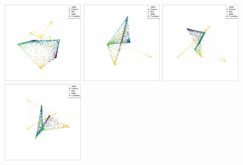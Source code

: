 \documentclass[
  letterpaper,
]{krantz}
\begin{document}
\begin{figure}

\begin{minipage}{0.33\linewidth}
\includegraphics[width=1.35417in,height=\textheight,keepaspectratio]{images/fashion_confustion_gt_36.png}\end{minipage}%
%
\begin{minipage}{0.33\linewidth}
\includegraphics[width=1.35417in,height=\textheight,keepaspectratio]{images/fashion_confusion_gt_58.png}\end{minipage}%
%
\begin{minipage}{0.33\linewidth}
\includegraphics[width=1.35417in,height=\textheight,keepaspectratio]{images/fashion_confusion_gt_69.png}\end{minipage}%
\newline
\begin{minipage}{0.33\linewidth}
\includegraphics[width=1.35417in,height=\textheight,keepaspectratio]{images/fashion_confusion_gt_161.png}\end{minipage}%
%
\begin{minipage}{0.33\linewidth}

\end{minipage}
\end{figure}
\end{document}
